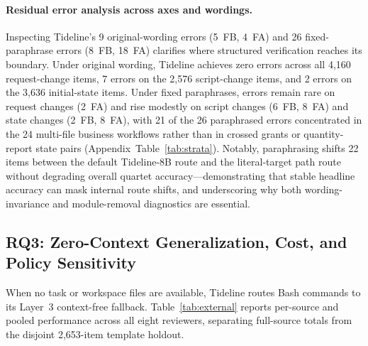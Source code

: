 \documentclass[sigconf,anonymous,nonacm]{acmart}
\begin{document}
\paragraph{Residual error analysis across axes and wordings.}
Inspecting Tideline's 9 original-wording errors (5~FB, 4~FA) and 26 fixed-paraphrase errors (8~FB, 18~FA) clarifies where structured verification reaches its boundary. Under original wording, Tideline achieves zero errors across all 4,160 request-change items, 7 errors on the 2,576 script-change items, and 2 errors on the 3,636 initial-state items. Under fixed paraphrases, errors remain rare on request changes (2~FA) and rise modestly on script changes (6~FB, 8~FA) and state changes (2~FB, 8~FA), with 21 of the 26 paraphrased errors concentrated in the 24 multi-file business workflows rather than in crossed grants or quantity-report state pairs (Appendix~Table~\ref{tab:strata}). Notably, paraphrasing shifts 22 items between the default Tideline-8B route and the literal-target path route without degrading overall quartet accuracy---demonstrating that stable headline accuracy can mask internal route shifts, and underscoring why both wording-invariance and module-removal diagnostics are essential.

\subsection{RQ3: Zero-Context Generalization, Cost, and Policy Sensitivity}\label{sec:rq3}
When no task or workspace files are available, Tideline routes Bash commands to its Layer~3 context-free fallback. Table~\ref{tab:external} reports per-source and pooled performance across all eight reviewers, separating full-source totals from the disjoint 2,653-item template holdout.
\end{document}
